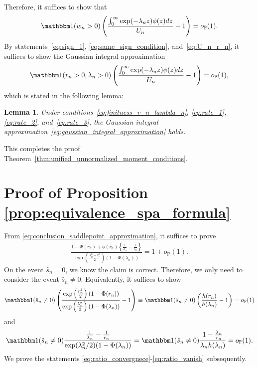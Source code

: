 \documentclass[12pt]{article}
\newtheorem{lemma}{Lemma}
\theoremstyle{definition}
\def\P{\mathbb{P}}
\def\P{\mathbb{P}}
\renewcommand{\P}{\mathbb{P}}							%
\newcommand{\indicator}{\mathbbm 1}						%
\begin{document}
Therefore, it suffices to show that
\begin{equation}
\indicator(w_n > 0)\left(\frac{\int_0^\infty \exp(-\lambda_n z)\phi(z)dz}{U_n}-1\right) = o_{\P}(1). \label{eq:final_step_Gaussian_integral}
\end{equation}
By statements~\eqref{eq:sign_1}, \eqref{eq:same_sign_condition}, and~\eqref{eq:U_n_r_n}, it suffices to show the Gaussian integral approximation
\begin{align}
	\indicator(r_n> 0,\lambda_n> 0)\left(\frac{\int_0^\infty \exp(-\lambda_n z)\phi(z)dz}{U_n}-1\right)=o_{\P}(1),
\label{eq:gaussian_integral_approximation}
\end{align}
which is stated in the following lemma:
\begin{lemma}\label{lem:final_result_except_lam_0}
Under conditions~\eqref{eq:finitness_r_n_lambda_n}, \eqref{eq:rate_1}, \eqref{eq:rate_2}, and~\eqref{eq:rate_3}, the Gaussian integral approximation~\eqref{eq:gaussian_integral_approximation} holds.
\end{lemma}
\noindent This completes the proof Theorem~\ref{thm:unified_unnormalized_moment_conditions}.

\section{Proof of Proposition \ref{prop:equivalence_spa_formula}}\label{sec:proof_proposition_equivalence_spa_formula}


From \eqref{eq:conclusion_saddlepoint_approximation}, it suffices to prove 
\begin{align*}
	\frac{1-\Phi(r_n)+\phi(r_n)\left\{\frac{1}{\lambda_n}-\frac{1}{r_n}\right\}}{\exp\left(\frac{\lambda_n^2-r_n^2}{2}\right)(1-\Phi(\lambda_n))}=1+o_{\P}(1).
\end{align*}
On the event $\hat s_n=0$, we know the claim is correct. Therefore, we only need to consider the event $\hat s_n\neq 0$. Equivalently, it suffices to show 
\begin{align}
	\indicator(\hat s_n\neq 0)\left(\frac{\exp\left(\frac{r_n^2}{2}\right)(1-\Phi(r_n))}{\exp\left(\frac{\lambda_n^2}{2}\right)(1-\Phi(\lambda_n))}-1\right)\equiv \indicator(\hat s_n\neq 0)\left(\frac{h(r_n)}{h(\lambda_n)}-1\right)=o_{\P}(1)\label{eq:ratio_convergnece}
\end{align}
and 
\begin{align}
	\indicator(\hat s_n\neq 0)\frac{\frac{1}{\lambda_n}-\frac{1}{r_n}}{\exp(\lambda_n^2/2)(1-\Phi(\lambda_n))}=\indicator(\hat s_n\neq 0)\frac{1-\frac{\lambda_n}{r_n}}{\lambda_nh(\lambda_n)}=o_{\P}(1)\label{eq:ratio_vanish}.
\end{align}
We prove the statements \eqref{eq:ratio_convergnece}-\eqref{eq:ratio_vanish} subsequently.
\end{document}
